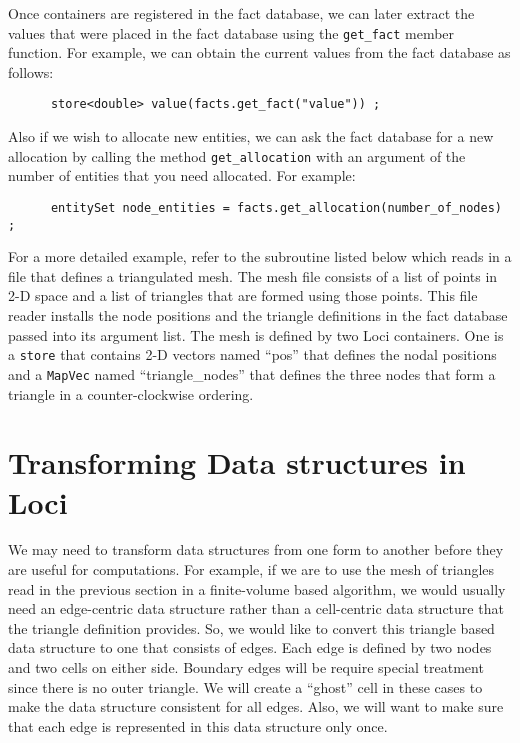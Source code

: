 \documentclass[10pt,epsf]{book}
\begin{document}
Once containers are registered in the fact database, we can later
extract the values that were placed in the fact database using the 
{\tt get\_fact} member function.  For example, we can obtain the
current values from the fact database as follows:
\begin{verbatim}
      store<double> value(facts.get_fact("value")) ;
\end{verbatim}

Also if we wish to allocate new entities, we can ask the fact database
for a new allocation by calling the method {\tt get\_allocation} with
an argument of the number of entities that you need allocated.  For
example:
\begin{verbatim}
      entitySet node_entities = facts.get_allocation(number_of_nodes) ;
\end{verbatim}

For a more detailed example, refer to the subroutine listed below
which reads in a file that defines a triangulated mesh.  The mesh file
consists of a list of points in 2-D space and a list of triangles that
are formed using those points.  This file reader installs the node
positions and the triangle definitions in the fact database passed
into its argument list.  The mesh is defined by two Loci containers.
One is a {\tt store} that contains 2-D vectors named ``pos'' that
defines the nodal positions and a {\tt MapVec} named
``triangle\_nodes'' that defines the three nodes that form a triangle
in a counter-clockwise ordering.



\section{Transforming Data structures in Loci}

We may need to transform data structures from one form to another
before they are useful for computations.  For example, if we are
to use the mesh of triangles read in the previous section in a
finite-volume based algorithm, we would usually need an edge-centric
data structure rather than a cell-centric data structure that the
triangle definition provides.  So, we would like to convert this
triangle based data structure to one that consists of edges.  Each
edge is defined by two nodes and two cells on either side.  Boundary
edges will be require special treatment since there is no outer
triangle.  We will create a ``ghost'' cell in these cases to make the
data structure consistent for all edges.  Also, we will want to make
sure that each edge is represented in this data structure only once.
\end{document}
